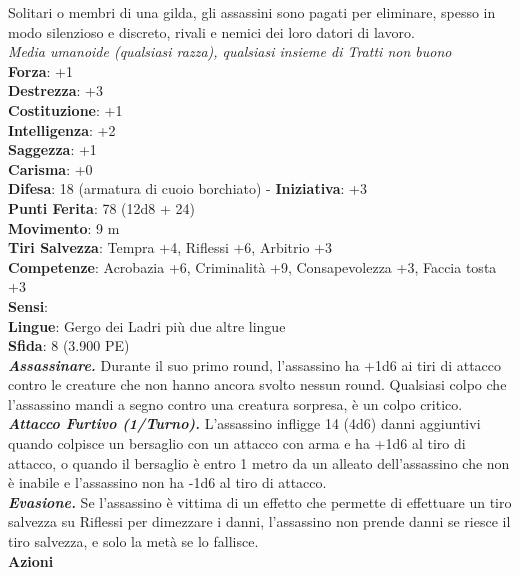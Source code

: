 \begin{multicols}{2}
Solitari o membri di una gilda, gli assassini sono pagati per eliminare, spesso in modo silenzioso e discreto, rivali e nemici dei loro datori di lavoro.\\
\emph{Media umanoide (qualsiasi razza), qualsiasi insieme di Tratti non buono}\\
\textbf{Forza}: +1\\
\textbf{Destrezza}: +3\\
\textbf{Costituzione}: +1\\
\textbf{Intelligenza}: +2\\
\textbf{Saggezza}: +1\\
\textbf{Carisma}: +0\\
\textbf{Difesa}: 18 (armatura di cuoio borchiato) - \textbf{Iniziativa}: +3\\
\textbf{Punti Ferita}: 78 (12d8 + 24)\\
\textbf{Movimento}: 9 m\\
\textbf{Tiri Salvezza}: Tempra +4, Riflessi +6, Arbitrio +3 \\
\textbf{Competenze}: Acrobazia +6, Criminalità +9, Consapevolezza +3, Faccia tosta +3\\
\textbf{Sensi}: \\
\textbf{Lingue}: Gergo dei Ladri più due altre lingue\\
\textbf{Sfida}: 8 (3.900 PE)\smallskip\\

\emph{\textbf{Assassinare.}} Durante il suo primo round, l'assassino ha +1d6 ai tiri di attacco contro le creature che non hanno ancora svolto nessun round. Qualsiasi colpo che l'assassino mandi a segno contro una creatura sorpresa, è un colpo critico.\\

\emph{\textbf{Attacco Furtivo (1/Turno).}} L'assassino infligge 14 (4d6) danni aggiuntivi quando colpisce un bersaglio con un attacco con arma e ha +1d6 al tiro di attacco, o quando il bersaglio è entro 1 metro da un alleato dell'assassino che non è inabile e l'assassino non ha -1d6 al tiro di attacco.\\

\emph{\textbf{Evasione.}} Se l'assassino è vittima di un effetto che permette di effettuare un tiro salvezza su Riflessi per dimezzare i danni, l'assassino non prende danni se riesce il tiro salvezza, e solo la metà se lo fallisce.\\

\smallskip\textbf{Azioni}\\


\end{multicols}
